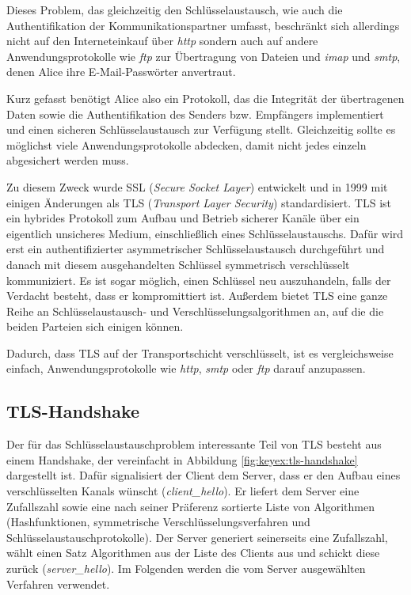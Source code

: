 Dieses Problem, das gleichzeitig den Schlüsselaustausch, wie auch die Authentifikation der Kommunikationspartner umfasst, beschränkt sich allerdings nicht auf
den Interneteinkauf über \emph{http} sondern auch auf andere Anwendungsprotokolle wie \emph{ftp} zur Übertragung von Dateien und \emph{imap} und \emph{smtp},
denen Alice ihre E-Mail-Passwörter anvertraut.

Kurz gefasst benötigt Alice also ein Protokoll, das die Integrität der übertragenen Daten sowie die Authentifikation des Senders bzw. Empfängers implementiert
und einen sicheren Schlüsselaustausch zur Verfügung stellt. Gleichzeitig sollte es möglichst viele Anwendungsprotokolle abdecken, damit nicht jedes einzeln
abgesichert werden muss.

Zu diesem Zweck wurde SSL (\emph{Secure Socket Layer}) entwickelt und in 1999 mit einigen Änderungen als TLS (\emph{Transport Layer Security}) standardisiert.
TLS ist ein hybrides Protokoll zum Aufbau und Betrieb sicherer Kanäle über ein eigentlich unsicheres Medium, einschließlich eines Schlüsselaustauschs.
Dafür wird erst ein authentifizierter asymmetrischer Schlüsselaustausch durchgeführt und danach mit diesem ausgehandelten Schlüssel symmetrisch
verschlüsselt kommuniziert. Es ist sogar möglich, einen Schlüssel neu auszuhandeln, falls der Verdacht besteht, dass er kompromittiert
ist. Außerdem bietet TLS eine ganze Reihe an Schlüsselaustausch- und Verschlüsselungsalgorithmen an, auf die die beiden Parteien sich
einigen können.

Dadurch, dass TLS auf der Transportschicht verschlüsselt, ist es vergleichsweise einfach, Anwendungsprotokolle wie \emph{http}, \emph{smtp} oder \emph{ftp}
darauf anzupassen.

\subsection{TLS-Handshake}
Der für das Schlüsselaustauschproblem interessante Teil von TLS besteht aus einem Handshake, der vereinfacht in Abbildung \ref{fig:keyex:tls-handshake}
dargestellt ist.
Dafür signalisiert der Client dem Server, dass er den Aufbau eines verschlüsselten Kanals wünscht (\emph{client\_hello}). Er liefert
dem Server eine Zufallszahl sowie eine nach seiner Präferenz sortierte Liste von Algorithmen (Hashfunktionen, symmetrische
Verschlüsselungsverfahren und Schlüsselaustauschprotokolle). Der Server generiert seinerseits eine Zufallszahl, wählt einen Satz
Algorithmen aus der Liste des Clients aus und schickt diese zurück (\emph{server\_hello}). Im Folgenden werden die vom Server ausgewählten
Verfahren verwendet.

